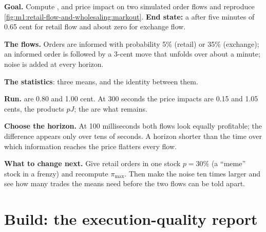 \begin{tutorial}
\textbf{Goal.} Compute ,  and price impact on
two simulated order flows and reproduce
\cref{fig:m1:retail-flow-and-wholesaling:markout}. \textbf{End state:} a
 after five minutes of 0.65 cent for retail flow and
about zero for exchange flow.
\begin{tutsteps}
\item \textbf{The flows.} Orders are informed with probability 5\% (retail)
or 35\% (exchange); an informed order is followed by a 3-cent move that
unfolds over about a minute; noise is added at every horizon.
\label{lst:m1:retail-flow-and-wholesaling:flows}
\item \textbf{The statistics}: three means, and the identity between them.
\label{lst:m1:retail-flow-and-wholesaling:stats}
\item \textbf{Run.}  are 0.80 and 1.00 cent. At 300
seconds the price impacts are 0.15 and 1.05 cents, the products $pJ$; the
 are what remains.
\item \textbf{Choose the horizon.} At 100 milliseconds both flows look
equally profitable; the difference appears only over tens of seconds. A
horizon shorter than the time over which information reaches the price
flatters every flow.
\end{tutsteps}
\textbf{What to change next.} Give retail orders in one stock $p = 30\%$ (a
``meme'' stock in a frenzy) and recompute $\pi_{\max}$. Then make the noise
ten times larger and see how many trades the means need before the two flows
can be told apart.
\end{tutorial}

\section{Build: the execution-quality report}\label{bld:m1:retail-flow-and-wholesaling:report}


